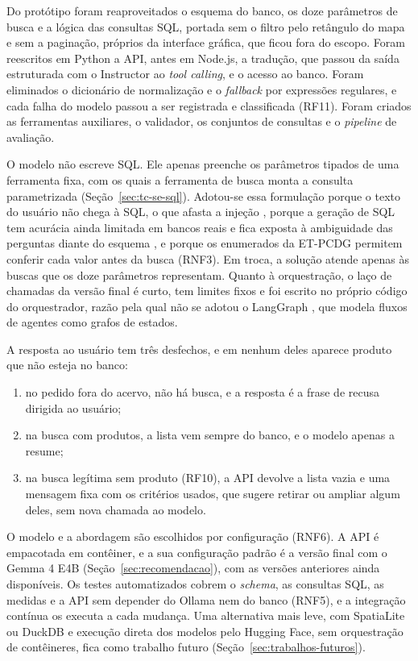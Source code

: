 Do protótipo foram reaproveitados o esquema do banco, os doze parâmetros de busca e a lógica das consultas SQL, portada sem o filtro pelo retângulo do mapa e sem a paginação, próprios da interface gráfica, que ficou fora do escopo. Foram reescritos em Python a API, antes em Node.js, a tradução, que passou da saída estruturada com o Instructor \cite{instructor2023} ao \textit{tool calling}, e o acesso ao banco. Foram eliminados o dicionário de normalização e o \textit{fallback} por expressões regulares, e cada falha do modelo passou a ser registrada e classificada (RF11). Foram criados as ferramentas auxiliares, o validador, os conjuntos de consultas e o \textit{pipeline} de avaliação.

O modelo não escreve SQL. Ele apenas preenche os parâmetros tipados de uma ferramenta fixa, com os quais a ferramenta de busca monta a consulta parametrizada (Seção~\ref{sec:tc-se-sql}). Adotou-se essa formulação porque o texto do usuário não chega à SQL, o que afasta a injeção \cite{pedro2025p2sql}, porque a geração de SQL tem acurácia ainda limitada em bancos reais \cite{li2023bird} e fica exposta à ambiguidade das perguntas diante do esquema \cite{liu2025survey}, e porque os enumerados da ET-PCDG permitem conferir cada valor antes da busca (RNF3). Em troca, a solução atende apenas às buscas que os doze parâmetros representam. Quanto à orquestração, o laço de chamadas da versão final é curto, tem limites fixos e foi escrito no próprio código do orquestrador, razão pela qual não se adotou o LangGraph \cite{langgraph2024}, que modela fluxos de agentes como grafos de estados.

A resposta ao usuário tem três desfechos, e em nenhum deles aparece produto que não esteja no banco:
\begin{enumerate}
  \item no pedido fora do acervo, não há busca, e a resposta é a frase de recusa dirigida ao usuário;
  \item na busca com produtos, a lista vem sempre do banco, e o modelo apenas a resume;
  \item na busca legítima sem produto (RF10), a API devolve a lista vazia e uma mensagem fixa com os critérios usados, que sugere retirar ou ampliar algum deles, sem nova chamada ao modelo.
\end{enumerate}

O modelo e a abordagem são escolhidos por configuração (RNF6). A API é empacotada em contêiner, e a sua configuração padrão é a versão final com o Gemma 4 E4B (Seção~\ref{sec:recomendacao}), com as versões anteriores ainda disponíveis. Os testes automatizados cobrem o \textit{schema}, as consultas SQL, as medidas e a API sem depender do Ollama nem do banco (RNF5), e a integração contínua os executa a cada mudança. Uma alternativa mais leve, com SpatiaLite ou DuckDB e execução direta dos modelos pelo Hugging Face, sem orquestração de contêineres, fica como trabalho futuro (Seção~\ref{sec:trabalhos-futuros}).

